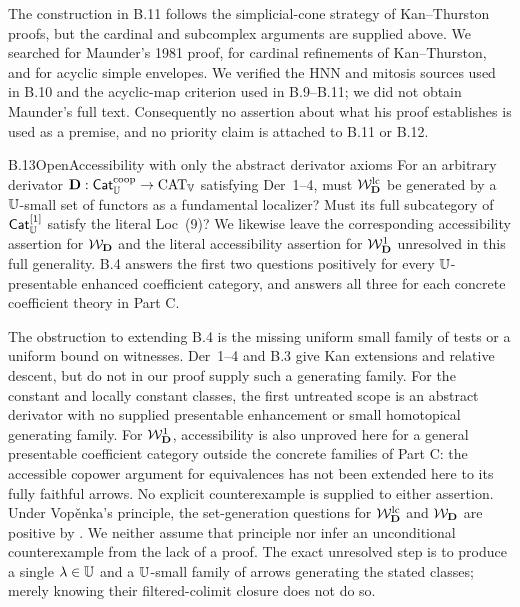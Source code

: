 The construction in B.11 follows the simplicial-cone
strategy of Kan--Thurston proofs, but the cardinal and
subcomplex arguments are supplied above. We searched
for Maunder's 1981 proof, for cardinal refinements of
Kan--Thurston, and for acyclic simple envelopes. We
verified the HNN and mitosis sources used in B.10 and
the acyclic-map criterion used in B.9--B.11; we did not
obtain Maunder's full text. Consequently no assertion
about what his proof establishes is used as a premise,
and no priority claim is attached to B.11 or B.12.
\begin{claim}{B.13}{Open}{Accessibility with only the abstract derivator axioms}
For an arbitrary derivator
$\mathbf D:\mathsf{Cat}_\mathbb U^{\mathrm{coop}}\to\mathrm{CAT}_\mathbb V$
satisfying Der~1--4, must $\mathcal W_{\mathbf D}^{\mathrm{lc}}$ be generated by a
$\mathbb U$-small set of functors as a fundamental localizer?
Must its full subcategory of $\mathsf{Cat}_\mathbb U^{[1]}$ satisfy
the literal Loc~(9)? We likewise leave the corresponding
accessibility assertion for $\mathcal W_{\mathbf D}$ and the literal
accessibility assertion for $\mathcal W_{\mathbf D}^{1}$ unresolved in this
full generality. B.4 answers the first two questions
positively for every $\mathbb U$-presentable enhanced
coefficient category, and answers all three for each
concrete coefficient theory in Part C.
\end{claim}
The obstruction to extending B.4 is the missing uniform
small family of tests or a uniform bound on witnesses.
Der~1--4 and B.3 give Kan extensions and relative descent,
but do not in our proof supply such a generating family.
For the constant and locally constant classes, the first
untreated scope is an abstract derivator with no supplied
presentable enhancement or small homotopical generating
family. For $\mathcal W_{\mathbf D}^{1}$, accessibility is also unproved here
for a general presentable coefficient category outside the
concrete families of Part C: the accessible copower argument
for equivalences has not been extended here to its
fully faithful arrows. No explicit counterexample is supplied
to either assertion. Under
Vop\v enka's principle, the set-generation questions for
$\mathcal W_{\mathbf D}^{\mathrm{lc}}$ and $\mathcal W_{\mathbf D}$ are positive by
\citet[Scholie~4.2.17]{Cisinski2006}. We neither assume
that principle nor infer an unconditional counterexample
from the lack of a proof. The exact unresolved step is
to produce a single $\lambda\in\mathbb U$ and a $\mathbb U$-small
family of arrows generating the stated classes; merely
knowing their filtered-colimit closure does not do so.


